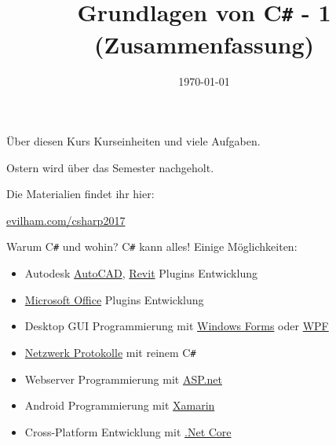 



\title{Grundlagen von C\texttt{\#} - 1 (Zusammenfassung)}
\date{\today}

\usepackage{subfig}


\maketitle

\begin{frame}{Über diesen Kurs}
	 Kurseinheiten und viele Aufgaben.
	
	Ostern wird über das Semester nachgeholt.
	
	\vspace{0.7cm}
	\centering Die Materialien findet ihr hier:
	
	\huge \href{https://evilham.com/csharp2017}{evilham.com/csharp2017}

\end{frame}

\begin{frame}{Warum C\texttt{\#} und wohin?}
C\texttt{\#} kann alles! Einige Möglichkeiten:
\begin{itemize}
\item Autodesk \href{https://en.wikipedia.org/wiki/AutoCAD}{AutoCAD}, \href{https://en.wikipedia.org/wiki/Revit}{Revit} Plugins Entwicklung
\item \href{https://dev.office.com/}{Microsoft Office} Plugins Entwicklung
\item Desktop GUI Programmierung mit \href{https://en.wikipedia.org/wiki/Windows_Forms}{Windows Forms} oder \href{http://www.wpf-tutorial.com/about-wpf/what-is-wpf/}{WPF}
\item \href{https://en.wikipedia.org/wiki/Network_socket}{Netzwerk Protokolle} mit reinem C\texttt{\#}
\item Webserver Programmierung mit \href{https://www.asp.net/}{ASP.net}
\item Android Programmierung mit \href{https://en.wikipedia.org/wiki/Xamarin}{Xamarin}
\item Cross-Platform Entwicklung mit \href{https://dot.net}{.Net Core}
\end{itemize}
\end{frame}

